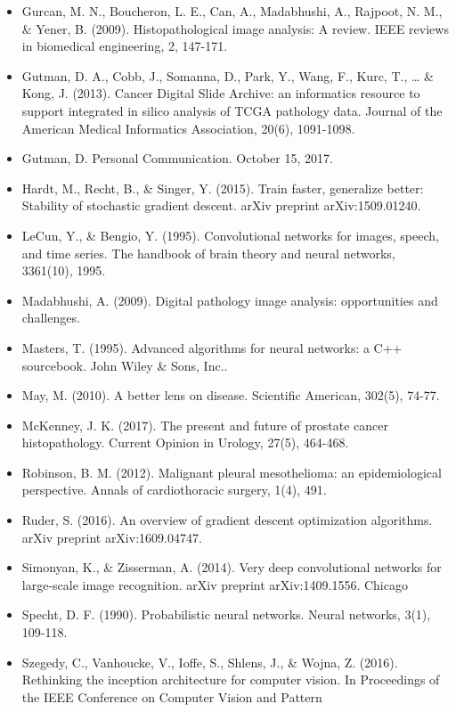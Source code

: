\documentclass[12pt,]{article}
\begin{document}
\begin{itemize}
\item
  Gurcan, M. N., Boucheron, L. E., Can, A., Madabhushi, A., Rajpoot, N.
  M., \& Yener, B. (2009). Histopathological image analysis: A review.
  IEEE reviews in biomedical engineering, 2, 147-171.
\item
  Gutman, D. A., Cobb, J., Somanna, D., Park, Y., Wang, F., Kurc, T.,
  \ldots{} \& Kong, J. (2013). Cancer Digital Slide Archive: an
  informatics resource to support integrated in silico analysis of TCGA
  pathology data. Journal of the American Medical Informatics
  Association, 20(6), 1091-1098.
\item
  Gutman, D. Personal Communication. October 15, 2017.
\item
  Hardt, M., Recht, B., \& Singer, Y. (2015). Train faster, generalize
  better: Stability of stochastic gradient descent. arXiv preprint
  arXiv:1509.01240.
\item
  LeCun, Y., \& Bengio, Y. (1995). Convolutional networks for images,
  speech, and time series. The handbook of brain theory and neural
  networks, 3361(10), 1995.
\item
  Madabhushi, A. (2009). Digital pathology image analysis: opportunities
  and challenges.
\item
  Masters, T. (1995). Advanced algorithms for neural networks: a C++
  sourcebook. John Wiley \& Sons, Inc..
\item
  May, M. (2010). A better lens on disease. Scientific American, 302(5),
  74-77.
\item
  McKenney, J. K. (2017). The present and future of prostate cancer
  histopathology. Current Opinion in Urology, 27(5), 464-468.
\item
  Robinson, B. M. (2012). Malignant pleural mesothelioma: an
  epidemiological perspective. Annals of cardiothoracic surgery, 1(4),
  491.
\item
  Ruder, S. (2016). An overview of gradient descent optimization
  algorithms. arXiv preprint arXiv:1609.04747.
\item
  Simonyan, K., \& Zisserman, A. (2014). Very deep convolutional
  networks for large-scale image recognition. arXiv preprint
  arXiv:1409.1556. Chicago
\item
  Specht, D. F. (1990). Probabilistic neural networks. Neural networks,
  3(1), 109-118.
\item
  Szegedy, C., Vanhoucke, V., Ioffe, S., Shlens, J., \& Wojna, Z.
  (2016). Rethinking the inception architecture for computer vision. In
  Proceedings of the IEEE Conference on Computer Vision and Pattern

\end{itemize}
\end{document}
